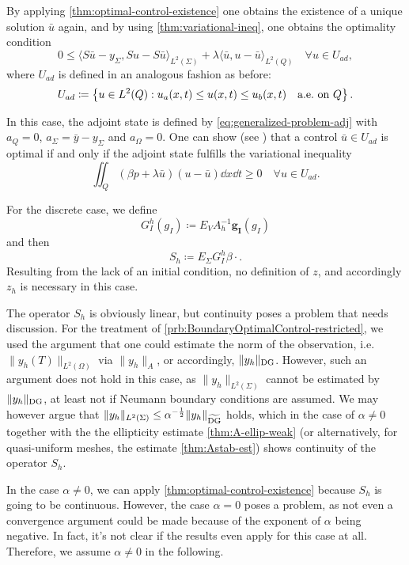 \documentclass[../thesis.tex]{subfiles}
\begin{document}
By applying \cref{thm:optimal-control-existence} one obtains the existence of a unique solution $\bar{u}$ again, and by using \cref{thm:variational-ineq}, one obtains the optimality condition
\[
	0 \leq \langle S \bar{u} - y_\Sigma, S u - S \bar{u} \rangle_{L^2(\Sigma)} + \lambda \langle \bar{u}, u - \bar{u} \rangle_{L^2(Q)} \quad \forall u \in U_{ad},
\]
where $U_{ad}$ is defined in an analogous fashion as before:
\[
	U_{ad} \coloneqq \left\{ u \in L^2(Q) \mathrel{}:\mathrel{} u_a(x, t) \leq u(x, t) \leq u_b(x, t) \quad \text{a.e.\ on $Q$} \right\}.
\]

In this case, the adjoint state is defined by \cref{eq:generalized-problem-adj} with $a_Q = 0$, $a_\Sigma = \bar{y} - y_\Sigma$ and $a_\Omega = 0$.
One can show (see \cite[Satz 3.21, p.\ 131]{Troeltzsch}) that a control $\bar{u} \in U_{ad}$ is optimal if and only if the adjoint state fulfills the variational inequality
\[
	\iint_Q ( \beta p + \lambda \bar{u} ) ( u - \bar{u} ) \dd x \dd t \geq 0 \quad \forall u \in U_{ad}.
\]

For the discrete case, we define
\[
	G_I^h(g_I) \coloneqq E_V A_h^{-1} \boldsymbol{g_I}(g_I)
\]
and then
\[
	S_h \coloneqq E_\Sigma G_I^h \beta \cdot.
\]
Resulting from the lack of an initial condition, no definition of $z$, and accordingly $z_h$ is necessary in this case.

The operator $S_h$ is obviously linear, but continuity poses a problem that needs discussion.
For the treatment of \cref{prb:BoundaryOptimalControl-restricted}, we used the argument that one could estimate the norm of the observation, i.e.\ $\| y_h(T) \|_{L^2(\Omega)}$ via $\| y_h \|_{A}$, or accordingly, $\| y_h \|_{\mathrm{DG}}$.
However, such an argument does not hold in this case, as $\| y_h \|_{L^2(\Sigma)}$ cannot be estimated by $\| y_h \|_{\mathrm{DG}}$, at least not if Neumann boundary conditions are assumed.
We may however argue that $\| y_h \|_{L^2(\Sigma)} \leq \alpha^{-\frac{1}{2}} \| y_h \|_{\widetilde{\mathrm{DG}}}$ holds, which in the case of $\alpha \neq 0$ together with the the ellipticity estimate \cref{thm:A-ellip-weak} (or alternatively, for quasi-uniform meshes, the estimate \cref{thm:Astab-est}) shows continuity of the operator $S_h$.

In the case $\alpha \neq 0$, we can apply \cref{thm:optimal-control-existence} because $S_h$ is going to be continuous.
However, the case $\alpha = 0$ poses a problem, as not even a convergence argument could be made because of the exponent of $\alpha$ being negative. In fact, it's not clear if the results even apply for this case at all. Therefore, we assume $\alpha \neq 0$ in the following.
\end{document}
